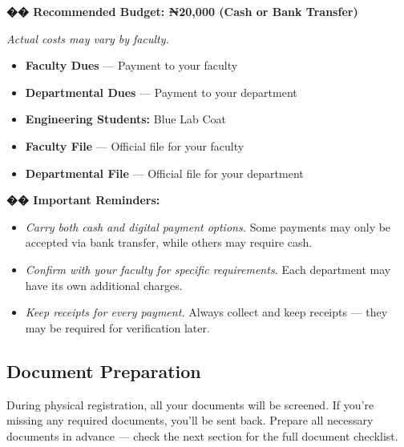 \documentclass[11pt,a4paper]{article}
\begin{document}
\begin{moneybox}
    \textbf{\color{primary}\Large �� Recommended Budget: ₦20,000 (Cash or Bank Transfer)}

    \vspace{0.3em}

    \textit{Actual costs may vary by faculty.}

    \vspace{0.5em}

    \begin{itemize}[leftmargin=1.5em, itemsep=0.3em]
        \item \textbf{Faculty Dues} --- Payment to your faculty
        \item \textbf{Departmental Dues} --- Payment to your department
        \item \textbf{Engineering Students:} Blue Lab Coat
        \item \textbf{Faculty File} --- Official file for your faculty
        \item \textbf{Departmental File} --- Official file for your department
    \end{itemize}

    \vspace{0.5em}

    \textbf{�� Important Reminders:}

    \begin{itemize}[leftmargin=1.5em, itemsep=0.3em]
        \item \textit{Carry both cash and digital payment options.} Some payments may only be accepted via bank transfer, while others may require cash.
        \item \textit{Confirm with your faculty for specific requirements.} Each department may have its own additional charges.
        \item \textit{Keep receipts for every payment.} Always collect and keep receipts --- they may be required for verification later.
    \end{itemize}
\end{moneybox}

\subsection{Document Preparation}

During physical registration, all your documents will be screened. If you're missing any required documents, you'll be sent back. Prepare all necessary documents in advance --- check the next section for the full document checklist.
\end{document}
